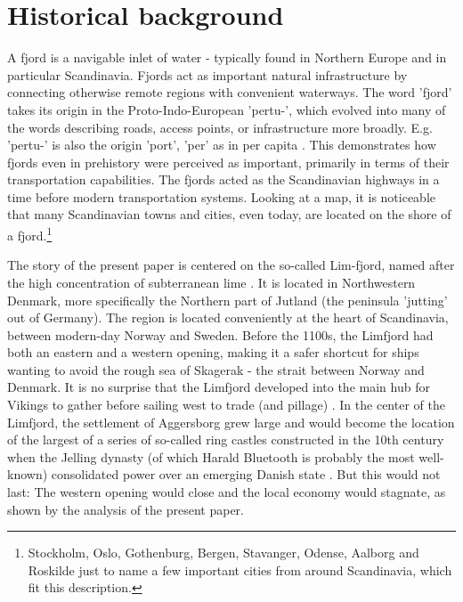 \documentclass[11pt]{article}
\begin{document}
\section{Historical background}
A fjord is a navigable inlet of water - typically found in Northern Europe and in particular Scandinavia. Fjords act as important natural infrastructure by connecting otherwise remote regions with convenient waterways. The word 'fjord' takes its origin in the Proto-Indo-European 'pertu-', which evolved into many of the words describing roads, access points, or infrastructure more broadly. E.g. 'pertu-' is also the origin 'port', 'per' as in per capita \citep{EtymFjord}. This demonstrates how fjords even in prehistory were perceived as important, primarily in terms of their transportation capabilities. The fjords acted as the Scandinavian highways in a time before modern transportation systems. Looking at a map, it is noticeable that many Scandinavian towns and cities, even today, are located on the shore of a fjord.\footnote{Stockholm, Oslo, Gothenburg, Bergen, Stavanger, Odense, Aalborg and Roskilde just to name a few important cities from around Scandinavia, which fit this description.}

The story of the present paper is centered on the so-called Lim-fjord, named after the high concentration of subterranean lime \citep{lexlimfjord2017}. It is located in Northwestern Denmark, more specifically the Northern part of Jutland (the peninsula 'jutting' out of Germany). The region is located conveniently at the heart of Scandinavia, between modern-day Norway and Sweden. Before the 1100s, the Limfjord had both an eastern and a western opening, making it a safer shortcut for ships wanting to avoid the rough sea of Skagerak - the strait between Norway and Denmark. It is no surprise that the Limfjord developed into the main hub for Vikings to gather before sailing west to trade (and pillage) \citep{Rasmussen1966}. In the center of the Limfjord, the settlement of Aggersborg grew large and would become the location of the largest of a series of so-called ring castles constructed in the 10th century when the Jelling dynasty (of which Harald Bluetooth is probably the most well-known) consolidated power over an emerging Danish state \citep{pedersen2014}. But this would not last: The western opening would close and the local economy would stagnate, as shown by the analysis of the present paper.
\end{document}
